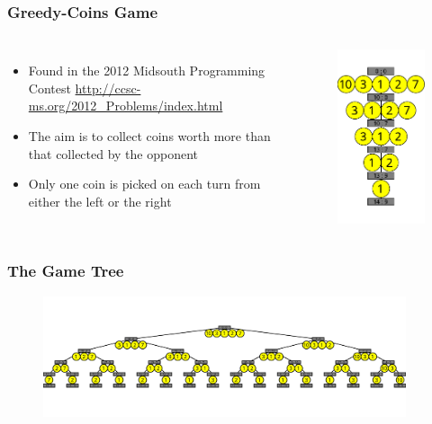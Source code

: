 \documentclass{beamer}
\begin{document}
\begin{frame}
  \frametitle{Greedy-Coins Game}
  \begin{columns}[c]
    \begin{itemize}
    \item Found in the 2012 Midsouth Programming Contest \url{http://ccsc-ms.org/2012_Problems/index.html}
      \pause
    \item The aim is to collect coins worth more than that collected by the opponent
      \pause
    \item Only one coin is picked on each turn from either the left or the right
    \end{itemize}
    \begin{figure}[h]
      \centering
      \includegraphics{figs/examples/one.pdf}
    \end{figure}
  \end{columns}
\end{frame}

\begin{frame}
  \frametitle{The Game Tree}
  \begin{figure}[h]
    \centering
    \includegraphics[width=0.95\textwidth]{figs/examples/full.pdf}
  \end{figure}
\end{frame}
\end{document}
